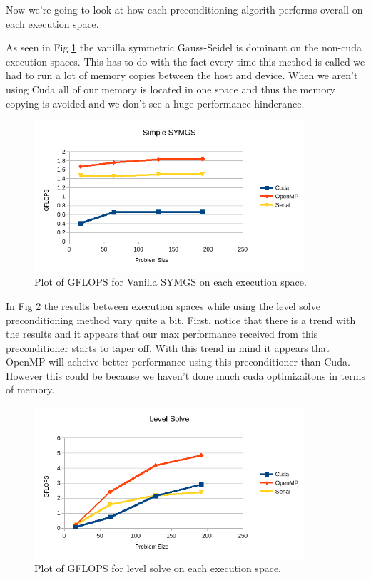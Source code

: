 \documentclass{ccr15}
\begin{document}
Now we're going to look at how each preconditioning algorith performs overall on each execution
space.

As seen in Fig \ref{Vanilla} the vanilla symmetric Gauss-Seidel is dominant on the non-cuda
execution spaces. This has to do with the fact every time this method is called we had to run
a lot of memory copies between the host and device. When we aren't using Cuda all of our memory
is located in one space and thus the memory copying is avoided and we don't see a huge
performance hinderance.

\begin{figure}[H]
  \centering
  \includegraphics[width=10cm]{plots/ZAB-VanillaSYMGS.png}
  \caption{Plot of GFLOPS for Vanilla SYMGS on each execution space.}
	\label{Vanilla}
\end{figure}

In Fig \ref{Level} the results between execution spaces while using the level solve
preconditioning method vary quite a bit. First, notice that there is a trend with the results and
it appears that our max performance received from this preconditioner starts to taper off. With
this trend in mind it appears that OpenMP will acheive better performance using this
preconditioner than Cuda. However this could be because we haven't done much cuda optimizaitons
in terms of memory.

\begin{figure}[H]
	\centering
	\includegraphics[width=10cm]{plots/ZAB-LevelSolve.png}
	\caption{Plot of GFLOPS for level solve on each execution space.}
	\label{Level}
\end{figure}
\end{document}
